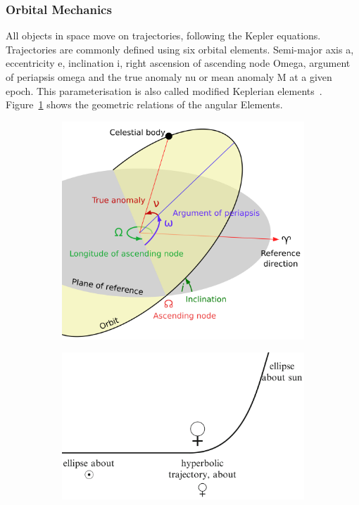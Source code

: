 \subsubsection{Orbital Mechanics} \label{sec:orbit_mechanics}
All objects in space move on trajectories, following the Kepler equations. Trajectories are commonly defined using six orbital elements. Semi-major axis \gls{a}, eccentricity \gls{e}, inclination \gls{i}, right ascension of ascending node \gls{Omega}, argument of periapsis \gls{omega} and the true anomaly \gls{nu} or mean anomaly \gls{M} at a given epoch. This parameterisation is also called modified Keplerian elements~\cite{Hintz2015FundamentalsAstrodynamics}. Figure~\ref{fig:kepler_elements} shows the geometric relations of the angular Elements.
\begin{figure}[htb]
    \centering
    \begin{subfigure}[b]{0.47\textwidth}
        \includegraphics[width=.8\textwidth]{doc/thesis/0_figures/Orbit_elements.png}
        \caption{}
        \label{fig:kepler_elements}
    \end{subfigure}
    \begin{subfigure}[b]{0.47\textwidth}
        \centering
        \includegraphics[width=\textwidth]{doc/thesis/0_figures/Hyperbolic_trajectory.png}

\end{subfigure}
\end{figure}
